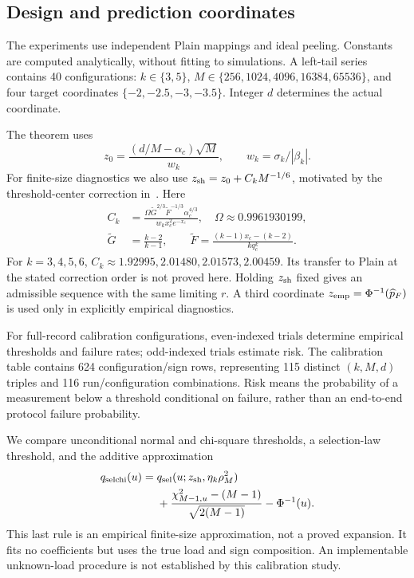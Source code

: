 \documentclass[11pt,a4paper]{article}
\begin{document}
\subsection{Design and prediction coordinates}
The experiments use independent Plain mappings and ideal peeling. Constants are computed analytically, without fitting to simulations. A left-tail series contains 40 configurations: $k\in\{3,5\}$, $M\in\{256,1024,4096,16384,65536\}$, and four target coordinates $\{-2,-2.5,-3,-3.5\}$. Integer $d$ determines the actual coordinate.

The theorem uses
\begin{equation}
z_0=\frac{(d/M-\alpha_c)\sqrt M}{w_k},\qquad w_k=\sigma_k/|\beta_k|.
\end{equation}
For finite-size diagnostics we also use $z_{\rm sh}=z_0+C_kM^{-1/6}$, motivated by the threshold-center correction in~\cite{dm}. Here
\begin{align}
C_k&=\frac{\Omega\widetilde G^{2/3}\widetilde F^{-1/3}\alpha_c^{4/3}}
{w_kx_c^2e^{-x_c}},\quad \Omega\approx0.9961930199,\\
\widetilde G&=\frac{k-2}{k-1},\qquad
\widetilde F=\frac{(k-1)x_c-(k-2)}{kq_c^k}.
\end{align}
For $k=3,4,5,6$, $C_k\approx1.92995,2.01480,2.01573,2.00459$. Its transfer to Plain at the stated correction order is not proved here. Holding $z_{\rm sh}$ fixed gives an admissible sequence with the same limiting $r$. A third coordinate $z_{\rm emp}=\Phi^{-1}(\widehat p_F)$ is used only in explicitly empirical diagnostics.

For full-record calibration configurations, even-indexed trials determine empirical thresholds and failure rates; odd-indexed trials estimate risk. The calibration table contains 624 configuration/sign rows, representing 115 distinct $(k,M,d)$ triples and 116 run/configuration combinations. Risk means the probability of a measurement below a threshold conditional on failure, rather than an end-to-end protocol failure probability.

We compare unconditional normal and chi-square thresholds, a selection-law threshold, and the additive approximation
\begin{equation}
\begin{split}
q_{\rm selchi}(u)={}&q_{\rm sel}(u;z_{\rm sh},\eta_k\rho_M^2)\\
&+\frac{\chi^2_{M-1,u}-(M-1)}{\sqrt{2(M-1)}}-\Phi^{-1}(u).
\end{split}\label{eq:selchi}
\end{equation}
This last rule is an empirical finite-size approximation, not a proved expansion. It fits no coefficients but uses the true load and sign composition. An implementable unknown-load procedure is not established by this calibration study.
\end{document}
